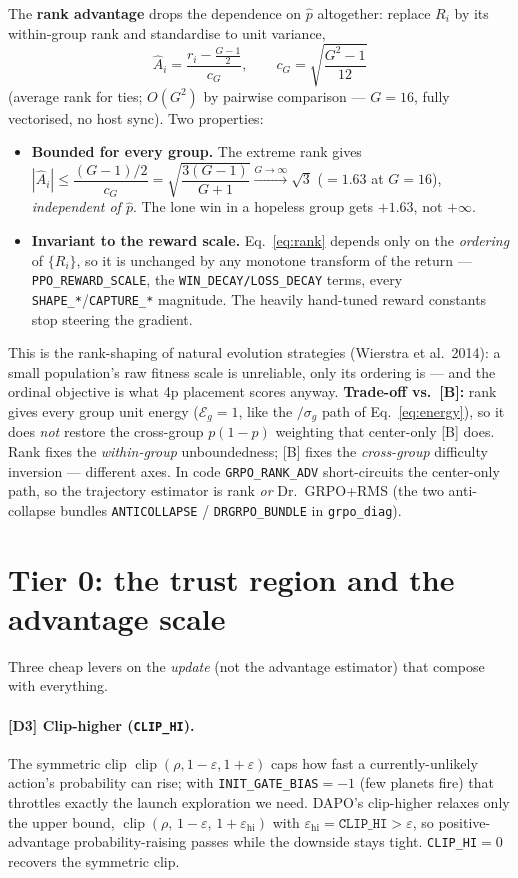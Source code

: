 \documentclass[11pt]{article}
\newcommand{\Adv}{\widehat{A}}
\newcommand{\clip}{\operatorname{clip}}
\newcommand{\cd}[1]{\texttt{#1}}
\begin{document}
The \textbf{rank advantage} drops the dependence on $\hat p$ altogether: replace $R_i$ by its within-group
rank and standardise to unit variance,
\begin{equation}
\Adv_i=\frac{r_i-\tfrac{G-1}{2}}{c_G},\qquad c_G=\sqrt{\frac{G^2-1}{12}}
\label{eq:rank}
\end{equation}
(average rank for ties; $O(G^2)$ by pairwise comparison --- $G=16$, fully vectorised, no host sync). Two
properties:
\begin{itemize}[nosep,leftmargin=1.6em]
\item \textbf{Bounded for every group.} The extreme rank gives
  $|\Adv_i|\le \dfrac{(G-1)/2}{c_G}=\sqrt{\dfrac{3(G-1)}{G+1}}\xrightarrow{G\to\infty}\sqrt3$ ($=1.63$ at
  $G=16$), \emph{independent of $\hat p$}. The lone win in a hopeless group gets $+1.63$, not $+\infty$.
\item \textbf{Invariant to the reward scale.} Eq.~\eqref{eq:rank} depends only on the \emph{ordering} of
  $\{R_i\}$, so it is unchanged by any monotone transform of the return --- \cd{PPO\_REWARD\_SCALE}, the
  \cd{WIN\_DECAY/LOSS\_DECAY} terms, every \cd{SHAPE\_*}/\cd{CAPTURE\_*} magnitude. The heavily hand-tuned
  reward constants stop steering the gradient.
\end{itemize}
This is the rank-shaping of natural evolution strategies (Wierstra et al.\ 2014): a small population's raw
fitness scale is unreliable, only its ordering is --- and the ordinal objective is what 4p placement
scores anyway. \textbf{Trade-off vs.\ [B]:} rank gives every group unit energy ($\mathcal E_g=1$, like the
$/\sigma_g$ path of Eq.~\eqref{eq:energy}), so it does \emph{not} restore the cross-group $p(1-p)$
weighting that center-only [B] does. Rank fixes the \emph{within-group} unboundedness; [B] fixes the
\emph{cross-group} difficulty inversion --- different axes. In code \cd{GRPO\_RANK\_ADV} short-circuits the
center-only path, so the trajectory estimator is rank \emph{or} Dr.\ GRPO+RMS (the two anti-collapse
bundles \cd{ANTICOLLAPSE} / \cd{DRGRPO\_BUNDLE} in \cd{grpo\_diag}).

\section{Tier 0: the trust region and the advantage scale}\label{sec:tier0}
Three cheap levers on the \emph{update} (not the advantage estimator) that compose with everything.

\paragraph{[D3] Clip-higher (\cd{CLIP\_HI}).} The symmetric clip $\clip(\rho,1-\varepsilon,1+\varepsilon)$
caps how fast a currently-unlikely action's probability can rise; with \cd{INIT\_GATE\_BIAS}$=-1$ (few
planets fire) that throttles exactly the launch exploration we need. DAPO's clip-higher relaxes only the
upper bound, $\clip(\rho,\,1-\varepsilon,\,1+\varepsilon_{\mathrm{hi}})$ with
$\varepsilon_{\mathrm{hi}}=\cd{CLIP\_HI}>\varepsilon$, so positive-advantage probability-raising passes
while the downside stays tight. \cd{CLIP\_HI}$=0$ recovers the symmetric clip.
\end{document}

